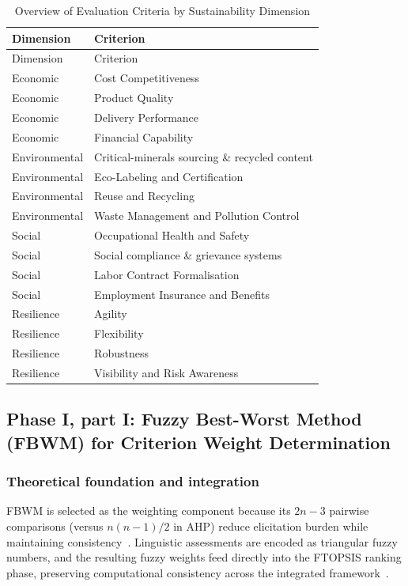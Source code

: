 \documentclass[preprint,12pt]{elsarticle}
\begin{document}
\begin{longtable}{@{}ll@{}}
\caption{Overview of Evaluation Criteria by Sustainability Dimension}\label{tab:criteria}\\
\toprule
Dimension & Criterion \\
\midrule
\endfirsthead
\toprule
Dimension & Criterion \\
\midrule
\endhead
Economic & Cost Competitiveness \\
Economic & Product Quality \\
Economic & Delivery Performance \\
Economic & Financial Capability \\
Environmental & Critical-minerals sourcing \& recycled content \\
Environmental & Eco-Labeling and Certification \\
Environmental & Reuse and Recycling \\
Environmental & Waste Management and Pollution Control \\
Social & Occupational Health and Safety \\
Social & Social compliance \& grievance systems \\
Social & Labor Contract Formalisation \\
Social & Employment Insurance and Benefits \\
Resilience & Agility \\
Resilience & Flexibility \\
Resilience & Robustness \\
Resilience & Visibility and Risk Awareness \\
\bottomrule
\end{longtable}

\subsection{Phase I, part I: Fuzzy Best-Worst Method (FBWM) for Criterion Weight Determination}

\subsubsection{Theoretical foundation and integration}
FBWM is selected as the weighting component because its $2n{-}3$ pairwise comparisons (versus $n(n{-}1)/2$ in AHP) reduce elicitation burden while maintaining consistency~\citep{haseli_2024_sf_bwm_cis,Celik_Kahraman_2021}. Linguistic assessments are encoded as triangular fuzzy numbers, and the resulting fuzzy weights feed directly into the FTOPSIS ranking phase, preserving computational consistency across the integrated framework~\citep{petrovic_etal_2022_axioms_efqm_fbwm_fmoora}.
\end{document}
